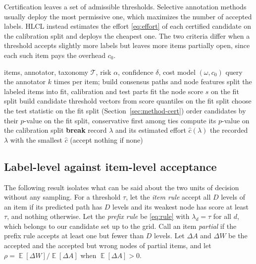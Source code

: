 \documentclass[preprint,12pt]{elsarticle}
\theoremstyle{definition}
\newcommand{\hlcl}{\textup{\textsc{HLCL}}}
\DeclareMathOperator{\E}{\mathbb{E}}
\begin{document}
Certification leaves a set of admissible thresholds. Selective annotation
methods usually deploy the most permissive one, which maximizes the number of
accepted labels. \hlcl{} instead estimates the effort \eqref{eq:effort} of each
certified candidate on the calibration split and deploys the cheapest one. The
two criteria differ when a threshold accepts slightly more labels but leaves more
items partially open, since each such item pays the overhead $c_0$.

\begin{algorithm}[t]
\caption{\hlcl{}}
\label{alg:hlcl}
\begin{algorithmic}[1]
\Require items, annotator, taxonomy $\mathcal{T}$, risk $\alpha$, confidence
$\delta$, cost model $(\omega,c_0)$
\State query the annotator $k$ times per item; build consensus paths and node features
\State split the labeled items into fit, calibration and test parts
\State fit the node score $s$ on the fit split
\State build candidate threshold vectors from score quantiles on the fit split
\State choose the test statistic on the fit split (Section~\ref{sec:method-cert})
\State order candidates by their $p$-value on the fit split, conservative first among ties
  \State compute its $p$-value on the calibration split
   \textbf{break}
  \EndIf
  \State record $\lambda$ and its estimated effort $\hat c(\lambda)$
\EndFor
\State \Return the recorded $\lambda$ with the smallest $\hat c$ (accept nothing if none)
\end{algorithmic}
\end{algorithm}

\subsection{Label-level against item-level acceptance}
\label{sec:method-prefix}

The following result isolates what can be said about the two units of decision
without any sampling. For a threshold
$\tau$, let the \emph{item rule} accept all $D$ levels of an item if its predicted path
has $D$ levels and its weakest node has score at least $\tau$, and nothing otherwise.
Let the \emph{prefix rule} be \eqref{eq:rule} with $\lambda_d=\tau$ for all $d$, which
belongs to our candidate set up to the grid. Call an item \emph{partial} if the prefix
rule accepts at least one but fewer than $D$ levels. Let $\Delta A$ and $\Delta W$ be
the accepted and the accepted but wrong nodes of partial items, and let
$\rho=\E[\Delta W]/\E[\Delta A]$ when $\E[\Delta A]>0$.
\end{document}
